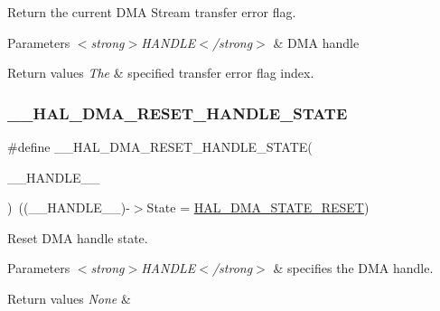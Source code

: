 Return the current D\+MA Stream transfer error flag. 


\begin{DoxyParams}{Parameters}
{\em $<$strong$>$\+H\+A\+N\+D\+L\+E$<$/strong$>$} & D\+MA handle \\
\hline
\end{DoxyParams}

\begin{DoxyRetVals}{Return values}
{\em The} & specified transfer error flag index. \\
\hline
\end{DoxyRetVals}
\mbox{\label{group___d_m_a_gaadcee34f0999c8eafd37de2f69daa0ac}} 
\subsubsection{\texorpdfstring{\+\_\+\+\_\+\+H\+A\+L\+\_\+\+D\+M\+A\+\_\+\+R\+E\+S\+E\+T\+\_\+\+H\+A\+N\+D\+L\+E\+\_\+\+S\+T\+A\+TE}{\_\_HAL\_DMA\_RESET\_HANDLE\_STATE}}
{\footnotesize\ttfamily \#define \+\_\+\+\_\+\+H\+A\+L\+\_\+\+D\+M\+A\+\_\+\+R\+E\+S\+E\+T\+\_\+\+H\+A\+N\+D\+L\+E\+\_\+\+S\+T\+A\+TE(\begin{DoxyParamCaption}\item[{}]{\+\_\+\+\_\+\+H\+A\+N\+D\+L\+E\+\_\+\+\_\+ }\end{DoxyParamCaption})~((\+\_\+\+\_\+\+H\+A\+N\+D\+L\+E\+\_\+\+\_\+)-\/$>$State = \hyperlink{group___d_m_a___exported___types_gga9c012af359987a240826f29073bbe463a9e7be73da32b8c837cde0318e0d5eed2}{H\+A\+L\+\_\+\+D\+M\+A\+\_\+\+S\+T\+A\+T\+E\+\_\+\+R\+E\+S\+ET})}



Reset D\+MA handle state. 


\begin{DoxyParams}{Parameters}
{\em $<$strong$>$\+H\+A\+N\+D\+L\+E$<$/strong$>$} & specifies the D\+MA handle. \\
\hline
\end{DoxyParams}

\begin{DoxyRetVals}{Return values}
{\em None} & \\
\hline
\end{DoxyRetVals}
\mbox{\label{group___d_m_a_ga448a8f809df86ccffae200ffd33d0a82}} 
